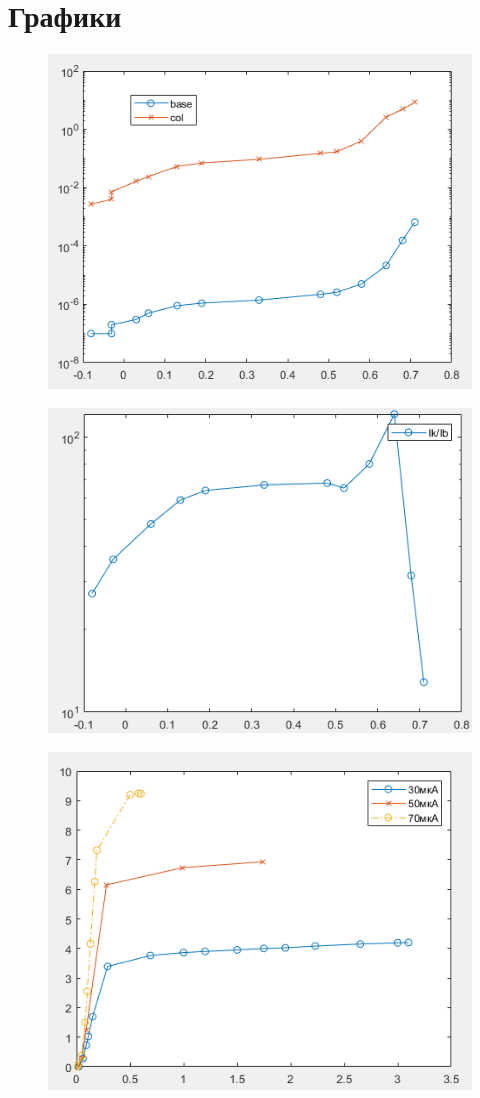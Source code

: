 \documentclass[a4paper,14pt]{article}
\begin{document}
\section{Графики}

\begin{figure}[H]
	\centering
	\includegraphics[width=0.7\linewidth]{images/graf11}
	\caption{}
	\label{fig:graf11}
\end{figure}


\begin{figure}[H]
	\centering
	\includegraphics[width=0.7\linewidth]{images/graf3}
	\caption{}
	\label{fig:graf3}
\end{figure}


\begin{figure}[H]
	\centering
	\includegraphics[width=0.7\linewidth]{images/graf1}
	\caption{}
	\label{fig:graf1}
\end{figure}
\end{document}
